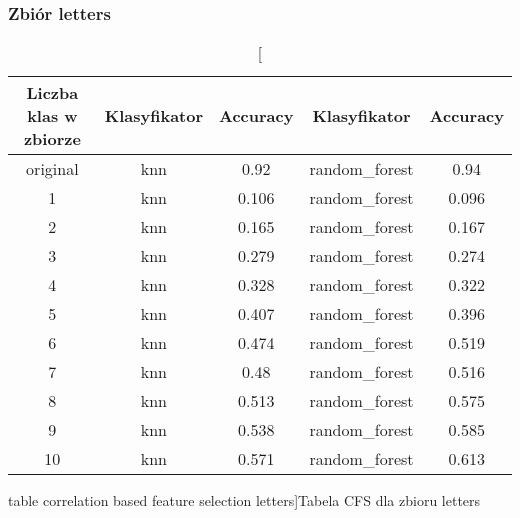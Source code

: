 \documentclass{classrep}
\begin{document}
{{            \subsubsection{Zbiór letters} {
            \begin{table}[!htbp]
\centering
\begin{tabular}{|c|c|c|c|c|}
\hline
Liczba klas w zbiorze & Klasyfikator & Accuracy & Klasyfikator & Accuracy \\ \hline
original & knn & 0.92 & random\_forest & 0.94 \\ \hline
1 & knn & 0.106 & random\_forest & 0.096 \\ \hline
2 & knn & 0.165 & random\_forest & 0.167 \\ \hline
3 & knn & 0.279 & random\_forest & 0.274 \\ \hline
4 & knn & 0.328 & random\_forest & 0.322 \\ \hline
5 & knn & 0.407 & random\_forest & 0.396 \\ \hline
6 & knn & 0.474 & random\_forest & 0.519 \\ \hline
7 & knn & 0.48 & random\_forest & 0.516 \\ \hline
8 & knn & 0.513 & random\_forest & 0.575 \\ \hline
9 & knn & 0.538 & random\_forest & 0.585 \\ \hline
10 & knn & 0.571 & random\_forest & 0.613 \\ \hline
\end{tabular}
\caption
[table correlation based feature selection letters]{Tabela CFS dla zbioru letters}
\label{table_correlation_based_feature_selection_letters}
\end{table}
\FloatBarrier
            }
}}
\end{document}
